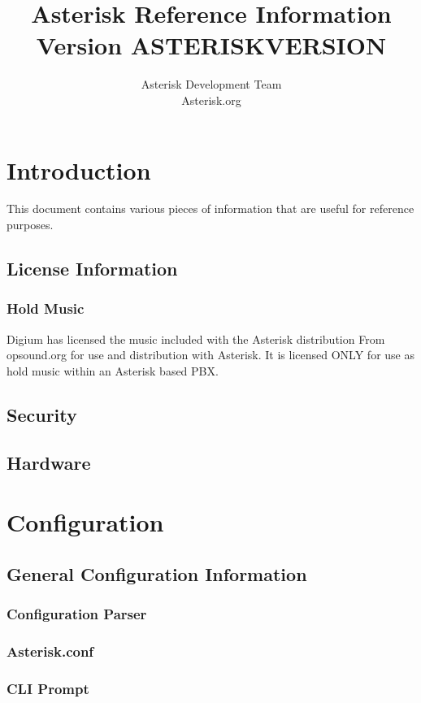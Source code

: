 \documentclass[12pt,a4]{report}
\author{Asterisk Development Team \\ Asterisk.org}
\title{Asterisk Reference Information \\ Version ASTERISKVERSION}
\begin{document}
\maketitle

\tableofcontents

\chapter{Introduction}

This document contains various pieces of information that are useful for
reference purposes.

  \section{License Information}
  
     \subsection{Hold Music}
       Digium has licensed the music included with
       the Asterisk distribution From opsound.org
       for use and distribution with Asterisk.  It
       is licensed ONLY for use as hold music within
       an Asterisk based PBX.
  \section{Security}
  
  \section{Hardware}
  

\chapter{Configuration}
  \section{General Configuration Information}
    \subsection{Configuration Parser}
    
    \subsection{Asterisk.conf}
    
    \subsection{CLI Prompt}
    
\end{document}
